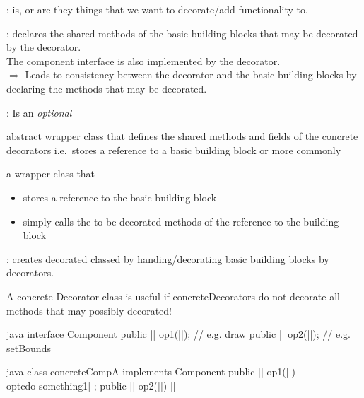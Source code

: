\begin{partbox}[Participants]
  \begin{itemizenosep}
    \item {}: is, or are they things that we want to
    decorate/add functionality to.
    \item {}: declares the shared methods of the basic
    building blocks that may be decorated by the decorator.\\
    The component interface is also implemented by the decorator.\\
    $\Rightarrow$ Leads to consistency between the decorator and the basic
    building blocks by declaring the methods that may be decorated.
    \item {}: Is an \textit{optional}
    \begin{itemizenosep}
      \item abstract wrapper class that defines the shared methods and fields of
      the concrete decorators i.e.\ stores a reference to a basic building block
      or more commonly
        \item a wrapper class that
        \begin{itemize}
            \item stores a reference to the basic building block 
            \item simply calls the to be decorated methods of the reference to
          the building block
        \end{itemize}
    \end{itemizenosep}
      \item {}: creates decorated classed by handing/decorating basic
      building blocks by decorators.
  \end{itemizenosep}
\end{partbox}
\begin{notebox}[Note]\nospacing
  A concrete Decorator class is useful if concreteDecorators do not decorate
  all methods that may possibly decorated!
\end{notebox}
\begin{codeboxNl}{java}
  interface Component{
    public || op1(||);    // e.g. draw
    public || op2(||);    // e.g. setBounds
  }
\end{codeboxNl}
\begin{codeboxNl}{java}
  class concreteCompA implements Component{
    public || op1(||){
        |\\optc{do something1}|
    };
    public || op2(||){
        ||
    }
  }
\end{codeboxNl}
